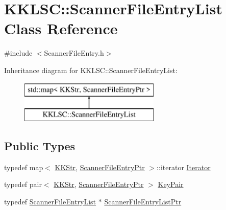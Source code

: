 \hypertarget{class_k_k_l_s_c_1_1_scanner_file_entry_list}{}\section{K\+K\+L\+SC\+:\+:Scanner\+File\+Entry\+List Class Reference}
\label{class_k_k_l_s_c_1_1_scanner_file_entry_list}


{\ttfamily \#include $<$Scanner\+File\+Entry.\+h$>$}

Inheritance diagram for K\+K\+L\+SC\+:\+:Scanner\+File\+Entry\+List\+:\begin{figure}[H]
\begin{center}
\leavevmode
\includegraphics[height=2.000000cm]{class_k_k_l_s_c_1_1_scanner_file_entry_list}
\end{center}
\end{figure}
\subsection*{Public Types}
\begin{DoxyCompactItemize}
\item 
typedef map$<$ \hyperlink{class_k_k_b_1_1_k_k_str}{K\+K\+Str}, \hyperlink{namespace_k_k_l_s_c_a54ff7eab3cb7195f02302b70282bfa8d}{Scanner\+File\+Entry\+Ptr} $>$\+::iterator \hyperlink{class_k_k_l_s_c_1_1_scanner_file_entry_list_afd6da779c73c629802802105410c5bcc}{Iterator}
\item 
typedef pair$<$ \hyperlink{class_k_k_b_1_1_k_k_str}{K\+K\+Str}, \hyperlink{namespace_k_k_l_s_c_a54ff7eab3cb7195f02302b70282bfa8d}{Scanner\+File\+Entry\+Ptr} $>$ \hyperlink{class_k_k_l_s_c_1_1_scanner_file_entry_list_aed0073610a35f1f98c200001a1689c6e}{Key\+Pair}
\item 
typedef \hyperlink{class_k_k_l_s_c_1_1_scanner_file_entry_list}{Scanner\+File\+Entry\+List} $\ast$ \hyperlink{class_k_k_l_s_c_1_1_scanner_file_entry_list_a78cd90eaedd4b64f537378ad33da776b}{Scanner\+File\+Entry\+List\+Ptr}
\end{DoxyCompactItemize}
